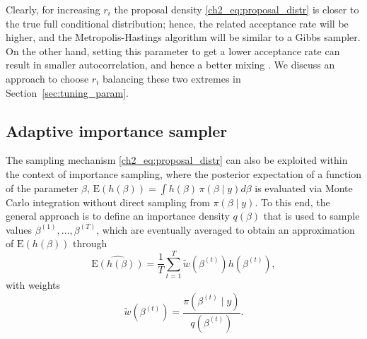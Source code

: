 %

Clearly, for increasing $r_i$ the proposal density \eqref{ch2_eq:proposal_distr} is closer to the true full conditional distribution; hence, the related acceptance rate will be higher, and the Metropolis-Hastings algorithm will be similar to a Gibbs sampler. 
On the other hand, setting this parameter to get a lower acceptance rate can result in smaller autocorrelation, and hence a better mixing \citep{robert2010}. We discuss an approach to choose $r_i$ balancing these two extremes in Section~\ref{sec:tuning_param}.


\subsection{Adaptive importance sampler}
\label{ch2_sec:is}

The sampling mechanism \eqref{ch2_eq:proposal_distr} can also be exploited within the context of importance sampling, where the posterior expectation of a function of the parameter $\beta$, $\mathrm{E}\left( h(\beta) \right) = \int h(\beta)\, \pi(\beta \mid y) d\beta$ is evaluated via Monte Carlo integration without direct sampling from $\pi(\beta \mid y)$. To this end, the general approach is to define an importance density $q(\beta)$ that is used to sample values $\beta^{(1)}, \dots, \beta^{(T)}$, which are eventually averaged to obtain an approximation of $\mathrm{E}\left( h(\beta) \right)$ through
\[
\widehat{\mathrm{E}( h(\beta))} = \frac{1}{T} \sum_{t=1}^T \tilde{w}(\beta^{(t)}) h(\beta^{(t)}),
\]
with weights 
\begin{equation*}
\tilde{w}(\beta^{(t)}) = \frac{\pi(\beta^{(t)} \mid y)}{q(\beta^{(t)})}.
\end{equation*}

